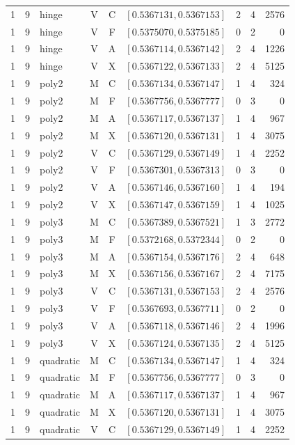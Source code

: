 \begin{longtable}{r r l c c l r r r}
1 & 9 & hinge & V & C & $[0.5367131,0.5367153]$ & 2 & 4 & 2576 \\
1 & 9 & hinge & V & F & $[0.5375070,0.5375185]$ & 0 & 2 & 0 \\
1 & 9 & hinge & V & A & $[0.5367114,0.5367142]$ & 2 & 4 & 1226 \\
1 & 9 & hinge & V & X & $[0.5367122,0.5367133]$ & 2 & 4 & 5125 \\
1 & 9 & poly2 & M & C & $[0.5367134,0.5367147]$ & 1 & 4 & 324 \\
1 & 9 & poly2 & M & F & $[0.5367756,0.5367777]$ & 0 & 3 & 0 \\
1 & 9 & poly2 & M & A & $[0.5367117,0.5367137]$ & 1 & 4 & 967 \\
1 & 9 & poly2 & M & X & $[0.5367120,0.5367131]$ & 1 & 4 & 3075 \\
1 & 9 & poly2 & V & C & $[0.5367129,0.5367149]$ & 1 & 4 & 2252 \\
1 & 9 & poly2 & V & F & $[0.5367301,0.5367313]$ & 0 & 3 & 0 \\
1 & 9 & poly2 & V & A & $[0.5367146,0.5367160]$ & 1 & 4 & 194 \\
1 & 9 & poly2 & V & X & $[0.5367147,0.5367159]$ & 1 & 4 & 1025 \\
1 & 9 & poly3 & M & C & $[0.5367389,0.5367521]$ & 1 & 3 & 2772 \\
1 & 9 & poly3 & M & F & $[0.5372168,0.5372344]$ & 0 & 2 & 0 \\
1 & 9 & poly3 & M & A & $[0.5367154,0.5367176]$ & 2 & 4 & 648 \\
1 & 9 & poly3 & M & X & $[0.5367156,0.5367167]$ & 2 & 4 & 7175 \\
1 & 9 & poly3 & V & C & $[0.5367131,0.5367153]$ & 2 & 4 & 2576 \\
1 & 9 & poly3 & V & F & $[0.5367693,0.5367711]$ & 0 & 2 & 0 \\
1 & 9 & poly3 & V & A & $[0.5367118,0.5367146]$ & 2 & 4 & 1996 \\
1 & 9 & poly3 & V & X & $[0.5367124,0.5367135]$ & 2 & 4 & 5125 \\
1 & 9 & quadratic & M & C & $[0.5367134,0.5367147]$ & 1 & 4 & 324 \\
1 & 9 & quadratic & M & F & $[0.5367756,0.5367777]$ & 0 & 3 & 0 \\
1 & 9 & quadratic & M & A & $[0.5367117,0.5367137]$ & 1 & 4 & 967 \\
1 & 9 & quadratic & M & X & $[0.5367120,0.5367131]$ & 1 & 4 & 3075 \\
1 & 9 & quadratic & V & C & $[0.5367129,0.5367149]$ & 1 & 4 & 2252 \\

\end{longtable}
